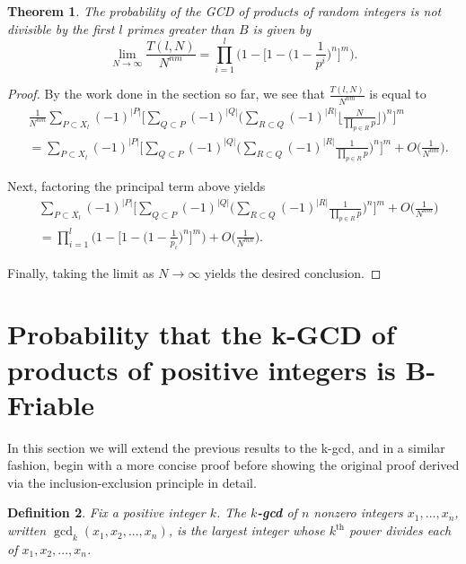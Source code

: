 \documentclass[12pt]{amsart}
\newtheorem{theorem}{Theorem}[subsection]
\newtheorem{definition}[theorem]{Definition}
\theoremstyle{definition}
\begin{document}
\begin{theorem} The probability of the GCD of products of random integers is not divisible by the first $l$ primes greater than $B$ is given by 
	$$\lim_{N\to\infty} \frac{T(l,N)}{N^{nm}} = \prod_{i=1}^{l} \Big(1 - \Big[1 - \Big(1-\frac{1}{p^i}\Big)^n\Big]^m\Big).$$
\end{theorem}

\begin{proof}
	By the work done in the section so far, we see that $\displaystyle \frac{T(l,N)}{N^{nm}}$ is equal to 
	\begin{align*}
		&\frac{1}{N^{nm}}\sum_{P\subset X_l}{(-1)^{|P|}}\Big[\sum_{Q\subset P}(-1)^{|Q|}\Big(\sum_{R\subset Q}(-1)^{|R|}\Big\lfloor\frac{N}{\prod_{p\in R} p} \Big\rfloor\Big)^n\Big]^m\\
		&= \sum_{P\subset X_l}{(-1)^{|P|}} \Big[\sum_{Q\subset P}(-1)^{|Q|} \Big(\sum_{R\subset Q}(-1)^{|R|} \frac{1}{\prod_{p\in R} p}\Big)^n\Big]^m+O\Big(\frac{1}{N^{nm}}\Big).
	\end{align*}
	
	\noindent Next, factoring the principal term above yields
	\begin{align*}
		&\sum_{P\subset X_l}{(-1)^{|P|}} \Big[\sum_{Q\subset P}(-1)^{|Q|} \Big(\sum_{R\subset Q}(-1)^{|R|}\frac{1}{\prod_{p\in R} p}\Big)^n \Big]^m + O\Big(\frac{1}{N^{nm}}\Big)\\ &= \prod_{i=1}^{l} \Big(1 - \Big[1 - \Big(1 - \frac{1}{p_i}\Big)^n\Big]^m \Big) + O\Big(\frac{1}{N^{mn}}\Big). 
	\end{align*}
	
	\noindent Finally, taking the limit as $N \to \infty$ yields the desired conclusion.
\end{proof}

\section{Probability that the k-GCD of products of positive integers is  B-Friable}
In this section we will extend the previous results to the k-gcd, and in a similar fashion, begin with a more concise proof before showing the original proof derived via the inclusion-exclusion principle in detail.

\begin{definition} Fix a positive integer $k$. The \textbf{$k$-gcd} of $n$ nonzero integers $x_1, ..., x_n$, written $\gcd_k(x_1,x_2, ...,x_n)$, is the largest integer whose $k^{\text{th}}$ power divides each of $x_1, x_2, ..., x_n$.
\end{definition}	
\end{document}
